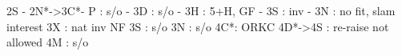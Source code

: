 2S - 
2N*->3C*- P  : s/o
		- 3D : s/o
		- 3H : 5+H, GF
		- 3S : inv
		- 3N : no fit, slam interest
3X : nat inv NF
3S : s/o
3N : s/o
4C*: ORKC
4D*->4S : re-raise not allowed
4M : s/o
